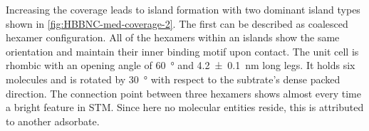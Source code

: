 %

Increasing the coverage leads to island formation with two dominant island types shown in \autoref{fig:HBBNC-med-coverage-2}. The first can be described as coalesced hexamer configuration. All of the hexamers within an islands show the same orientation and maintain their inner binding motif upon contact. The unit cell is rhombic with an opening angle of \SI{60}{\degree} and \SI{4.2 \pm 0.1}{\nano \meter} long legs. It holds six molecules and is rotated by \SI{30}{\degree} with respect to the subtrate's dense packed direction. The connection point between three hexamers shows almost every time a bright feature in STM. Since here no molecular entities reside, this is attributed to another adsorbate. 

